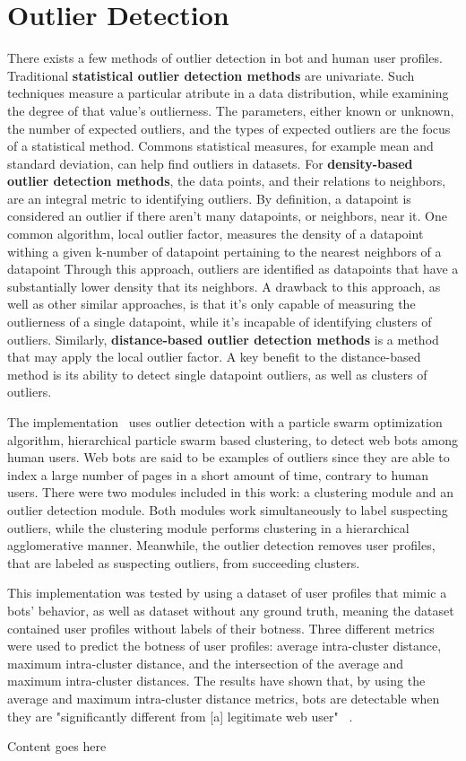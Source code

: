 
\section{Outlier Detection}\label{sec:outlier-detection}
There exists a few methods of outlier detection in bot and human user profiles.
Traditional \textbf{statistical outlier detection methods} are univariate.
Such techniques measure a particular atribute in a data distribution, while examining the degree of that value's outlierness.
The parameters, either known or unknown, the number of expected outliers, and the types of expected outliers are the focus of a statistical method.
Commons statistical measures, for example mean and standard deviation, can help find outliers in datasets.
For \textbf{density-based outlier detection methods}, the data points, and their relations to neighbors, are an integral metric to identifying outliers.
By definition, a datapoint is considered an outlier if there aren't many datapoints, or neighbors, near it.
One common algorithm, local outlier factor, measures the density of a datapoint withing a given k-number of datapoint pertaining to the nearest neighbors of a datapoint
Through this approach, outliers are identified as datapoints that have a substantially lower density that its neighbors.
A drawback to this approach, as well as other similar approaches, is that it's only capable of measuring the outlierness of a single datapoint, while it's incapable of identifying clusters of outliers.
Similarly, \textbf{distance-based outlier detection methods} is a method that may apply the local outlier factor.
A key benefit to the distance-based method is its ability to detect single datapoint outliers, as well as clusters of outliers.

The implementation~\cite{particle_swarm} uses outlier detection with a particle swarm optimization algorithm, hierarchical particle swarm based clustering, to detect web bots among human users.
Web bots are said to be examples of outliers since they are able to index a large number of pages in a short amount of time, contrary to human users.
There were two modules included in this work: a clustering module and an outlier detection module.
Both modules work simultaneously to label suspecting outliers, while the clustering module performs clustering in a hierarchical agglomerative manner.
Meanwhile, the outlier detection removes user profiles, that are labeled as suspecting outliers, from succeeding clusters.

This implementation was tested by using a dataset of user profiles that mimic a bots' behavior, as well as dataset without any ground truth, meaning the dataset contained user profiles without labels of their botness.
Three different metrics were used to predict the botness of user profiles: average intra-cluster distance, maximum intra-cluster distance, and the intersection of the average and maximum intra-cluster distances.
The results have shown that, by using the average and maximum intra-cluster distance metrics, bots are detectable when they are "significantly different from [a] legitimate web user" ~\cite{particle_swarm}.

Content goes here~\cite{optimized_outlier_bot_detection}
